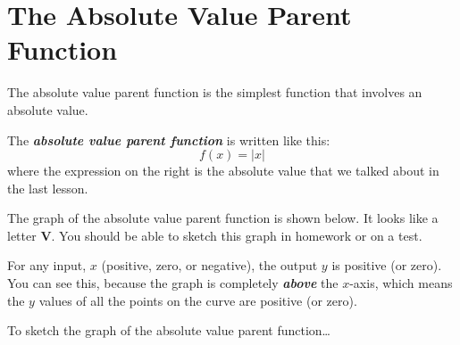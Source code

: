 

\section*{The Absolute Value Parent Function}

The absolute value parent function is the simplest function that involves an absolute value.

\begin{center}
    \begin{tcolorbox}
        The {\bfseries\itshape absolute value parent function} is written like this:
        \[
            f(x) = |x|
        \]
        where the expression on the right is the absolute value that we talked about 
        in the last lesson.
    \end{tcolorbox}
\end{center}

The graph of the absolute value parent function is shown below.
It looks like a letter {\sffamily\bfseries V}.
You should be able to sketch this graph in homework or on a test.

\begin{center}
\end{center}

For any input, $x$ (positive, zero, or negative), the output $y$ is positive (or zero). 
You can see this, because the graph is completely {\bfseries\itshape above} the $x$-axis,
which means the $y$ values of all the points on the curve are positive (or zero).

\begin{myConceptSteps}{To sketch the graph of the absolute value parent function\dots}
\end{myConceptSteps}



